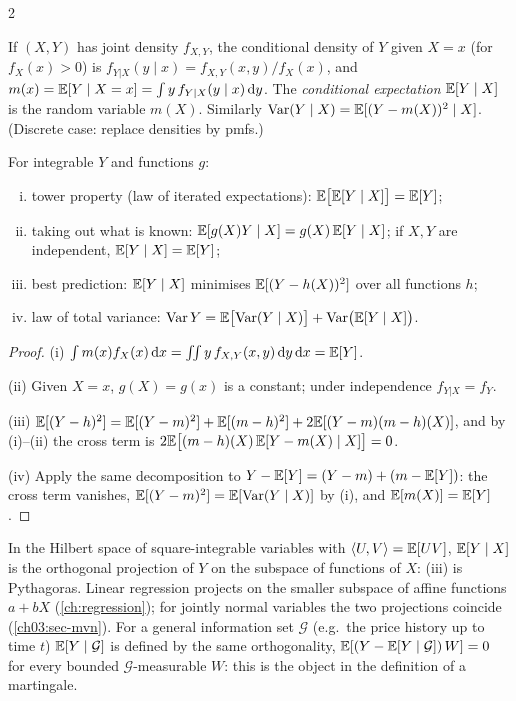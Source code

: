 \begin{paracol}{2}
\begin{definition}
If $(X,Y)$ has joint density $f_{X,Y}$, the conditional density of $Y$ given $X=x$ (for $f_X(x)>0$) is
$f_{Y|X}(y\mid x)=f_{X,Y}(x,y)/f_X(x)$, and $m(x)=\mathbb{E}[Y\mid X=x]=\int y\,f_{Y|X}(y\mid x)\,\mathrm{d} y$. The
\emph{conditional expectation} $\mathbb{E}[Y\mid X]$ is the random variable $m(X)$. Similarly
$\operatorname{Var}(Y\mid X)=\mathbb{E}[(Y-m(X))^2\mid X]$. (Discrete case: replace densities by pmfs.)
\end{definition}

\begin{proposition}[Properties]\label{ch03:prop-condexp}
For integrable $Y$ and functions $g$:
\begin{enumerate}[(i)]
  \item tower property (law of iterated expectations): $\mathbb{E}\bigl[\mathbb{E}[Y\mid X]\bigr]=\mathbb{E}[Y]$;
  \item taking out what is known: $\mathbb{E}[g(X)Y\mid X]=g(X)\,\mathbb{E}[Y\mid X]$; if $X,Y$ are independent, $\mathbb{E}[Y\mid X]=\mathbb{E}[Y]$;
  \item best prediction: $\mathbb{E}[Y\mid X]$ minimises $\mathbb{E}[(Y-h(X))^2]$ over all functions $h$;
  \item law of total variance: $\operatorname{Var} Y=\mathbb{E}\bigl[\operatorname{Var}(Y\mid X)\bigr]+\operatorname{Var}\bigl(\mathbb{E}[Y\mid X]\bigr)$.
\end{enumerate}
\end{proposition}
\begin{proof}
(i) $\int m(x)f_X(x)\,\mathrm{d} x=\iint y\,f_{X,Y}(x,y)\,\mathrm{d} y\,\mathrm{d} x=\mathbb{E}[Y]$.

(ii) Given $X=x$, $g(X)=g(x)$ is a constant; under
independence $f_{Y|X}=f_Y$.

(iii) $\mathbb{E}[(Y-h)^2]=\mathbb{E}[(Y-m)^2]+\mathbb{E}[(m-h)^2]+2\mathbb{E}[(Y-m)(m-h)(X)]$, and by (i)--(ii) the
cross term is $2\mathbb{E}\bigl[(m-h)(X)\,\mathbb{E}[Y-m(X)\mid X]\bigr]=0$.

(iv) Apply the same decomposition to
$Y-\mathbb{E}[Y]=(Y-m)+(m-\mathbb{E}[Y])$: the cross term vanishes, $\mathbb{E}[(Y-m)^2]=\mathbb{E}[\operatorname{Var}(Y\mid X)]$ by (i), and $\mathbb{E}[m(X)]=\mathbb{E}[Y]$.
\end{proof}

\begin{intuition}
In the Hilbert space of square-integrable variables with $\langle U,V\rangle=\mathbb{E}[UV]$, $\mathbb{E}[Y\mid X]$ is the orthogonal
projection of $Y$ on the subspace of functions of $X$: (iii) is Pythagoras. Linear regression projects on the
smaller subspace of affine functions $a+bX$ (\cref{ch:regression}); for jointly normal variables the two
projections coincide (\cref{ch03:sec-mvn}). For a general information set $\mathcal G$ (e.g.\ the price history up
to time $t$) $\mathbb{E}[Y\mid\mathcal G]$ is defined by the same orthogonality, $\mathbb{E}[(Y-\mathbb{E}[Y\mid\mathcal G])\,W]=0$ for every
bounded $\mathcal G$-measurable $W$: this is the object in the definition of a martingale.
\end{intuition}


\end{paracol}
